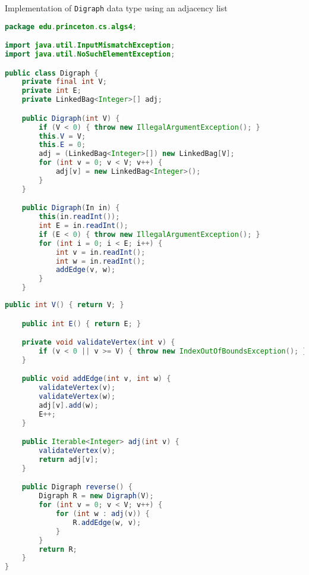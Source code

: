 \documentclass[8pt,a4paper,compress]{beamer}
\begin{document}
\begin{frame}[fragile]
\pause

Implementation of \lstinline{Digraph} data type using an adjacency list
\begin{lstlisting}[language=java,style=focusin]
package edu.princeton.cs.algs4;

import java.util.InputMismatchException;
import java.util.NoSuchElementException;

public class Digraph {
    private final int V;
    private int E;
    private LinkedBag<Integer>[] adj;

    public Digraph(int V) {
        if (V < 0) { throw new IllegalArgumentException(); }
        this.V = V;
        this.E = 0;
        adj = (LinkedBag<Integer>[]) new LinkedBag[V];
        for (int v = 0; v < V; v++) { 
            adj[v] = new LinkedBag<Integer>(); 
        }
    }

    public Digraph(In in) {
        this(in.readInt());
        int E = in.readInt();
        if (E < 0) { throw new IllegalArgumentException(); }
        for (int i = 0; i < E; i++) {
            int v = in.readInt();
            int w = in.readInt();
            addEdge(v, w); 
        }
    }
\end{lstlisting}
\end{frame}

\begin{frame}[fragile]
\pause

\begin{lstlisting}[language=java,style=focusin]
    public int V() { return V; }

    public int E() { return E; }

    private void validateVertex(int v) {
        if (v < 0 || v >= V) { throw new IndexOutOfBoundsException(); }
    }

    public void addEdge(int v, int w) {
        validateVertex(v);
        validateVertex(w);
        adj[v].add(w);
        E++;
    }

    public Iterable<Integer> adj(int v) {
        validateVertex(v);
        return adj[v];
    }

    public Digraph reverse() {
        Digraph R = new Digraph(V);
        for (int v = 0; v < V; v++) {
            for (int w : adj(v)) {
                R.addEdge(w, v);
            }
        }
        return R;
    }
}
\end{lstlisting}
\end{frame}
\end{document}
